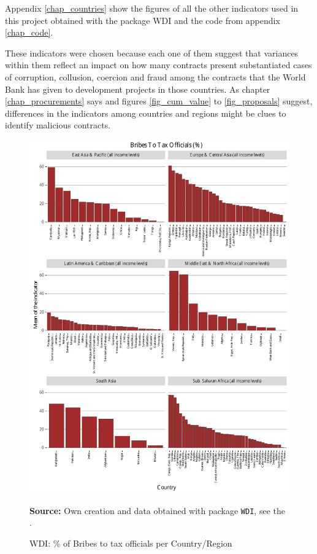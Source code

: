  Appendix \ref{chap_countries} show the figures of all the other indicators used in this project obtained with the package WDI\parencite{wb_r} and the code from appendix \ref{chap_code}.

 These indicators were chosen because each one of them suggest that variances within them reflect an impact on how many contracts present substantiated cases of corruption, collusion, coercion and fraud among the contracts that the World Bank has given to development projects in those countries. As chapter \ref{chap_procurements} says and figures \ref{fig_cum_value} to \ref{fig_proposals}  suggest, differences in the indicators among countries and regions might be clues to identify malicious contracts. 

\begin{figure}[H]
\begin{center}
\caption{WDI: \% of Bribes to tax officials per Country/Region}
\label{fig_wdi_bribes}
\includegraphics[max height=.9\textheight]{../img/wdi_bribes_to_tax_officials_perc.pdf}
\end{center}
\noindent \footnotesize{\textbf{Source:} Own creation and data obtained with package \texttt{WDI}, see the \cite{wb_r}.}
\end{figure}

